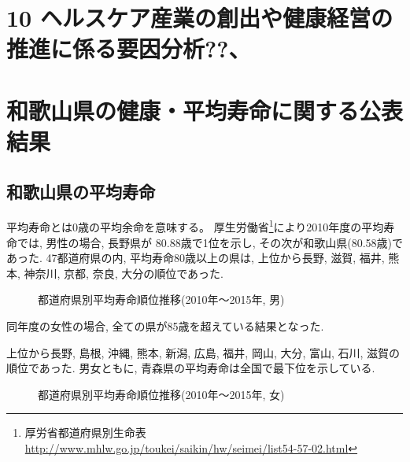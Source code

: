 \chapter{10 ヘルスケア産業の創出や健康経営の推進に係る要因分析??、
}




\chapter{
和歌山県の健康・平均寿命に関する公表結果}




\section{和歌山県の平均寿命}
平均寿命とは0歳の平均余命を意味する。
厚生労働省\footnote{
	厚労省都道府県別生命表
	\url{http://www.mhlw.go.jp/toukei/saikin/hw/seimei/list54-57-02.html}}により2010年度の平均寿命では,
男性の場合, 長野県が 80.88歳で1位を示し, その次が和歌山県(80.58歳)であった. 47都道府県の内, 平均寿命80歳以上の県は,
上位から長野, 滋賀,  福井, 熊本,  神奈川,   京都,   奈良,   大分の順位であった.

\begin{figure}[h!]
	\begin{center}
		\caption{都道府県別平均寿命順位推移(2010年〜2015年, 男)}
	\end{center}
\end{figure}


同年度の女性の場合, 全ての県が85歳を超えている結果となった.

上位から長野, 島根, 沖縄, 熊本, 新潟, 広島, 福井, 岡山, 大分, 富山, 石川, 滋賀の順位であった.
男女ともに, 青森県の平均寿命は全国で最下位を示している.
\begin{figure}[h!]
	\begin{center}
		\caption{都道府県別平均寿命順位推移(2010年〜2015年, 女)}\end{center}
\end{figure}






